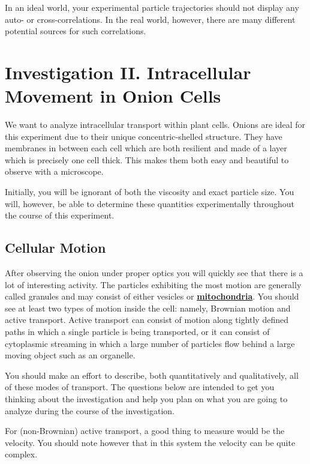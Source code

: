 \documentclass{../lab}
\begin{document}
In an ideal world, your experimental particle trajectories should not display any auto- or cross-correlations. In the real world, however, there are many different potential sources for such correlations.

\section{Investigation II. Intracellular Movement in Onion Cells}
\label{sec:InvestigationII}

We want to analyze intracellular transport within plant cells. Onions are ideal for this experiment due to their unique concentric-shelled structure. They have membranes in between each cell which are both resilient and made of a layer which is precisely one cell thick. This makes them both easy and beautiful to observe with a microscope.

Initially, you will be ignorant of both the viscosity and exact particle size. You will, however, be able to determine these quantities experimentally throughout the course of this experiment.

\subsection{Cellular Motion}

After observing the onion under proper optics you will quickly see that there is a lot of interesting activity. The particles exhibiting the most motion are generally called granules and may consist of either vesicles or \href{https://drive.google.com/file/d/11dTpwbLwxOk2RSkeMMbuF_-GOCxmNsw0/view?usp=drive_link}{\textbf{mitochondria}}. You should see at least two types of motion inside the cell: namely, Brownian motion and active transport. Active transport can consist of motion along tightly defined paths in which a single particle is being transported, or it can consist of cytoplasmic streaming in which a large number of particles flow behind a large moving object such as an organelle.

You should make an effort to describe, both quantitatively and qualitatively, all of these modes of transport. The questions below are intended to get you thinking about the investigation and help you plan on what you are going to analyze during the course of the investigation.

For (non-Brownian) active transport, a good thing to measure would be the velocity. You should note however that in this system the velocity can be quite complex.
\end{document}
